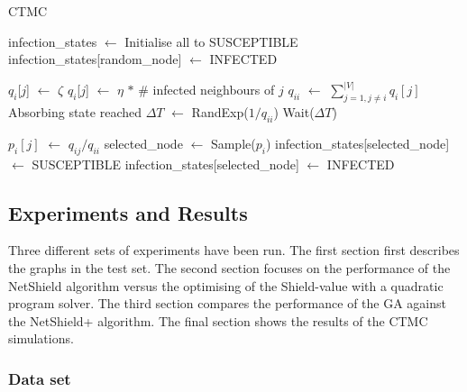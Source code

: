 \documentclass[11pt]{article}
\theoremstyle{definition}
\newcommand*\Let[2]{\State #1 $\gets$ #2}
\begin{document}
\begin{algorithm}
  \caption{CTMC
    \label{alg:CTMC}}
  \begin{algorithmic}[1]
    
    \Statex
    \Let{infection\_states}{Initialise all to SUSCEPTIBLE}
    \Let{infection\_states[random\_node]}{INFECTED}
    
                \Let{$q_{i}$[$j$]}{$\zeta$}
            \Else
                \Let{$q_{i}$[$j$]}{$\eta$ $*$ \# infected neighbours of $j$}
            \EndIf
        \EndFor
        \Let{$q_{ii}$}{ $\sum_{j=1, j \neq i}^{|V|} q_i[j]$}
                \State Absorbing state reached
            \Else
                \Let{$\Delta T$}{RandExp($1/q_{ii}$)}
                \State Wait($\Delta T$)
                
                    \Let{$p_i[j]$}{$q_{ij}/q_{ii}$}
                \EndFor
                \Let{selected\_node}{Sample($p_i$)}
                    \Let{infection\_states[selected\_node]}{SUSCEPTIBLE}
                \Else
                    \Let{infection\_states[selected\_node]}{INFECTED}
                \EndIf
            \EndIf
    \EndWhile
  \end{algorithmic}
\end{algorithm}

\subsection{Experiments and Results}

Three different sets of experiments have been run. The first section first describes the graphs in the test set. The second section focuses on the performance of the NetShield algorithm versus the optimising of the Shield-value with a quadratic program solver. The third section compares the performance of the GA against the NetShield+ algorithm. The final section shows the results of the CTMC simulations.

\subsubsection{Data set}
\end{document}
